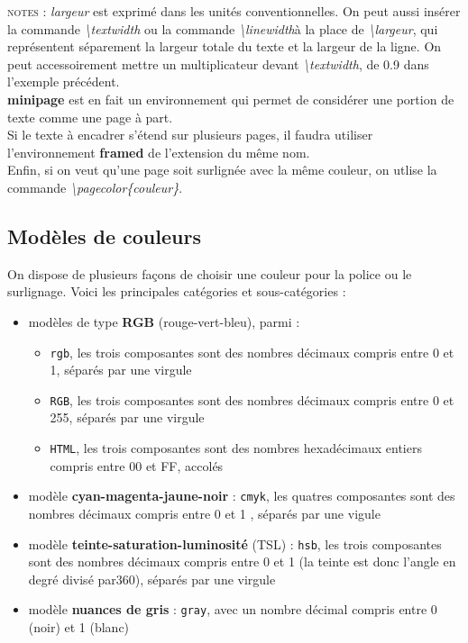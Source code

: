 \documentclass[a4paper, 10pt]{book}
\begin{document}
\textsc{notes :} \textit{largeur} est exprimé dans les unités conventionnelles. On peut aussi insérer la commande \textit{\textbackslash textwidth} ou la commande \textit{\textbackslash linewidth}à la place de \textit{\textbackslash largeur}, qui représentent séparement la largeur totale du texte et la largeur de la ligne. On peut accessoirement mettre un multiplicateur devant \textit{\textbackslash textwidth}, de 0.9 dans l'exemple précédent.\\
\textbf{minipage} est en fait un environnement qui permet de considérer une portion de texte comme une page à part.\\
Si le texte à encadrer s'étend sur plusieurs pages, il faudra utiliser l'environnement \textbf{framed} de l'extension du même nom.\\
Enfin, si on veut qu'une page soit surlignée avec la même couleur, on utlise la commande \textit{\textbackslash pagecolor\{couleur\}}.

\subsection{Modèles de couleurs}

On dispose de plusieurs façons de choisir une couleur pour la police ou le surlignage. Voici les principales catégories et sous-catégories :
\\
\pagebreak
\begin{itemize}
\item modèles de type \textbf{RGB} (rouge-vert-bleu), parmi :
\begin{itemize}
\item \texttt{rgb}, les trois composantes sont des nombres décimaux compris entre 0 et 1, séparés par une virgule
\item \texttt{RGB}, les trois composantes sont des nombres décimaux compris entre 0 et 255, séparés par une virgule
\item \texttt{HTML}, les trois composantes sont des nombres hexadécimaux entiers compris entre 00 et FF, accolés
\end{itemize}
\item modèle \textbf{cyan-magenta-jaune-noir} : \texttt{cmyk}, les quatres composantes sont des nombres décimaux compris entre 0 et 1 , séparés par une vigule
\item modèle \textbf{teinte-saturation-luminosité} (TSL) : \texttt{hsb}, les trois composantes sont des nombres décimaux compris entre 0 et 1 (la teinte est donc l'angle en degré divisé par360), séparés par une virgule
\item modèle \textbf{nuances de gris} : \texttt{gray}, avec un nombre décimal compris entre 0 (noir) et 1 (blanc)\\
\end{itemize}
\end{document}
